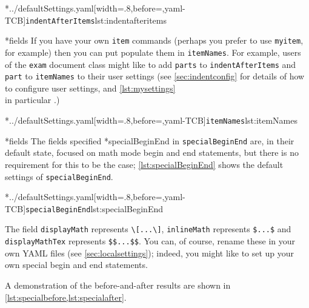 	\begin{cmhtcbraster}[raster columns=3,
			raster left skip=-3.5cm,
			raster right skip=-2cm,
			raster column skip=.03\linewidth]
		\cmhlistingsfromfile[style=indentAfterItems]*{../defaultSettings.yaml}[width=.8\linewidth,before=\centering,yaml-TCB]{\texttt{indentAfterItems}}{lst:indentafteritems}
	\end{cmhtcbraster}

*{fields}
	If you have your own \texttt{item} commands (perhaps you prefer to use
	\texttt{myitem}, for example) then you can put populate them in
	\texttt{itemNames}. For example, users of the \texttt{exam} document class
	might like to add \texttt{parts} to \texttt{indentAfterItems} and
	\texttt{part} to \texttt{itemNames} to their user settings (see
	\vref{sec:indentconfig} for details of how to configure user settings, and
	\vref{lst:mysettings} \\ in particular \label{page:examsettings}.)

	\cmhlistingsfromfile[style=itemNames]*{../defaultSettings.yaml}[width=.8\linewidth,before=\centering,yaml-TCB]{\texttt{itemNames}}{lst:itemNames}

*{fields}\label{yaml:specialBeginEnd}
	The fields specified%
	*{specialBeginEnd} in
	\texttt{specialBeginEnd} are, in their default state, focused on math mode begin and end
	statements, but there is no requirement for this to be the case; \cref{lst:specialBeginEnd}
	shows the default settings of \texttt{specialBeginEnd}.

	\cmhlistingsfromfile[style=specialBeginEnd]*{../defaultSettings.yaml}[width=.8\linewidth,before=\centering,yaml-TCB]{\texttt{specialBeginEnd}}{lst:specialBeginEnd}

	The field \texttt{displayMath} represents \lstinline!\[...\]!,
	\texttt{inlineMath} represents
	\lstinline!$...$! and \texttt{displayMathTex} represents \lstinline!$$...$$!.
	You can, of course, rename these in your own YAML files (see \vref{sec:localsettings});
	indeed, you might like to set up your own special begin and end statements.

	A demonstration of the before-and-after results are shown in \cref{lst:specialbefore,lst:specialafter}.

	\begin{cmhtcbraster}
	\end{cmhtcbraster}

